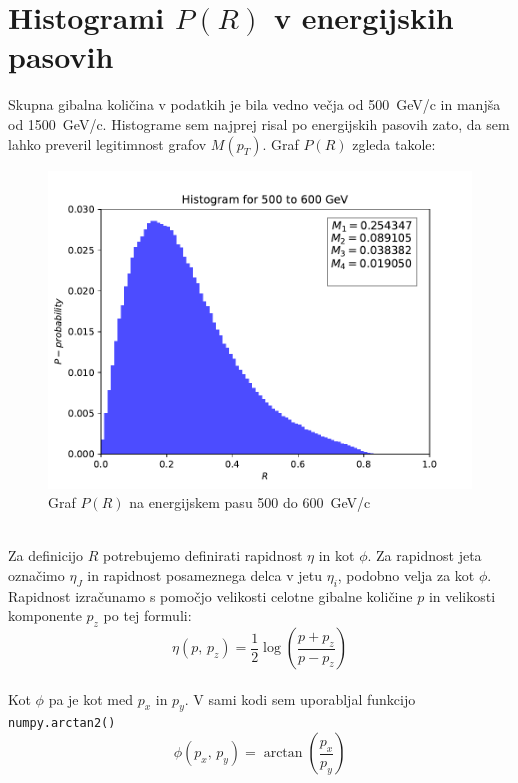 \section{Histogrami $P(R)$ v energijskih pasovih}\label{section2}
Skupna gibalna količina v podatkih je bila vedno večja od \SI{500}{\giga\electronvolt}/c
in manjša od \SI{1500}{\giga\electronvolt}/c. Histograme sem najprej risal po energijskih
pasovih zato, da sem lahko preveril legitimnost grafov $M(p_T)$. Graf $P(R)$ zgleda takole:
\begin{figure}[h]
    \begin{center}
        \includegraphics[width=13cm]{sections/section2/figures/1.pdf}
        \caption{Graf $P(R)$ na energijskem pasu 500 do \SI{600}{\giga\electronvolt}/c}
        \label{slika 2}
    \end{center}
\end{figure}
\\
Za definicijo $R$ potrebujemo definirati rapidnost $\eta$ in kot $\phi$. Za rapidnost jeta označimo $\eta_J$ in rapidnost
posameznega delca v jetu $\eta_i$, podobno velja za kot $\phi$. Rapidnost izračunamo
s pomočjo velikosti celotne gibalne količine $p$ in velikosti komponente $p_z$ po tej formuli: 
\begin{equation}
    \eta(p,\,p_z) = \frac{1}{2} \log \left(\frac{p+p_z}{p-p_z}\right) 
\end{equation}
\\
Kot $\phi$ pa je kot med $p_x$ in $p_y$. V sami kodi sem uporabljal funkcijo \verb|numpy.arctan2()|
\begin{equation}
    \phi(p_x, \, p_y) = \arctan\left(\frac{p_x}{p_y}\right)
\end{equation}
